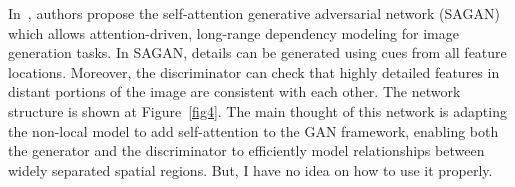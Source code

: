 \documentclass[a4paper]{article}
\begin{document}
In~\cite{self}, authors propose the self-attention generative adversarial network (SAGAN) which allows attention-driven, long-range dependency modeling for image generation tasks. In SAGAN, details can be generated using cues from all feature locations. Moreover, the discriminator can check that highly detailed features in distant portions of the image are consistent with each other. The network structure is shown at Figure~\ref{fig4}. The main thought of this network is adapting the non-local model to add self-attention to the GAN framework, enabling both the generator and the discriminator to efficiently model relationships between widely separated spatial regions. But, I have no idea on how to use it properly.

{\small

}
\end{document}
